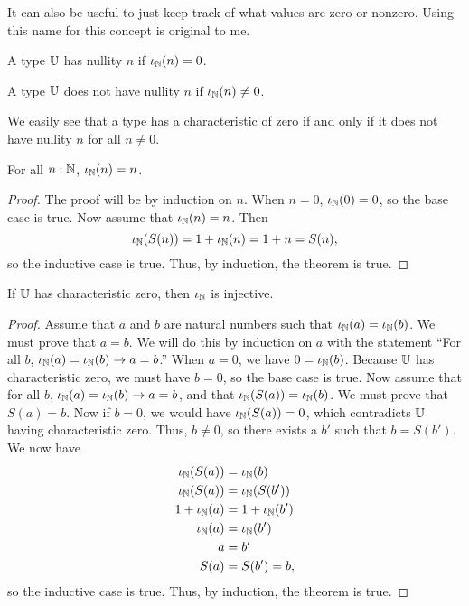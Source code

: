 \documentclass[../math.tex]{subfiles}
\begin{document}
It can also be useful to just keep track of what values are zero or nonzero.
Using this name for this concept is original to me.

\begin{class}
    A type $\mathbb{U}$ has nullity $n$ if $\iota_{\mathbb{N}}(n) = 0$.
\end{class}
\begin{class}
    A type $\mathbb{U}$ does not have nullity $n$ if $\iota_{\mathbb{N}}(n) \neq 0$.
\end{class}

We easily see that a type has a characteristic of zero if and only if it does
not have nullity $n$ for all $n \neq 0$.

\begin{theorem}
    For all $n : \mathbb{N}$, $\iota_{\mathbb{N}}(n) = n$.
\end{theorem}
\begin{proof}
    The proof will be by induction on $n$.  When $n = 0$, $\iota_{\mathbb{N}}(0) = 0$, so
    the base case is true.  Now assume that $\iota_{\mathbb{N}}(n) = n$.  Then
    \[
        \iota_{\mathbb{N}}(S(n)) = 1 + \iota_{\mathbb{N}}(n) = 1 + n = S(n),
    \]
    so the inductive case is true.  Thus, by induction, the theorem is true.
\end{proof}

\begin{instance}
    If $\mathbb{U}$ has characteristic zero, then $\iota_{\mathbb{N}}$ is injective.
\end{instance}
\begin{proof}
    Assume that $a$ and $b$ are natural numbers such that $\iota_{\mathbb{N}}(a) =
    \iota_{\mathbb{N}}(b)$.  We must prove that $a = b$.  We will do this by induction on
    $a$ with the statement ``For all $b$, $\iota_{\mathbb{N}}(a) = \iota_{\mathbb{N}}(b) \rightarrow
    a = b$.''  When $a = 0$, we have $0 = \iota_{\mathbb{N}}(b)$.  Because $\mathbb{U}$ has
    characteristic zero, we must have $b = 0$, so the base case is true.  Now
    assume that for all $b$, $\iota_{\mathbb{N}}(a) = \iota_{\mathbb{N}}(b) \rightarrow a = b$, and
    that $\iota_{\mathbb{N}}(S(a)) = \iota_{\mathbb{N}}(b)$.  We must prove that $S(a) = b$.  Now if
    $b = 0$, we would have $\iota_{\mathbb{N}}(S(a)) = 0$, which contradicts $\mathbb{U}$ having
    characteristic zero.  Thus, $b \neq 0$, so there exists a $b'$ such that $b
    = S(b')$.  We now have
    \begin{align*}
        \iota_{\mathbb{N}}(S(a)) &= \iota_{\mathbb{N}}(b) \\
        \iota_{\mathbb{N}}(S(a)) &= \iota_{\mathbb{N}}(S(b')) \\
        1 + \iota_{\mathbb{N}}(a) &= 1 + \iota_{\mathbb{N}}(b') \\
        \iota_{\mathbb{N}}(a) &= \iota_{\mathbb{N}}(b') \\
        a &= b' \\
        S(a) &= S(b') = b,
    \end{align*}
    so the inductive case is true.  Thus, by induction, the theorem is true.
\end{proof}
\end{document}
